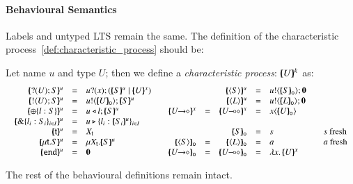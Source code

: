 
\paragraph{Behavioural Semantics}

Labels and untyped LTS remain the same. The definition of the
characteristic process~\ref{def:characteristic_process} should be:
%
\begin{definition}\rm
	Let name $u$ and type $U$; then we define a {\em characteristic process}:
	$[\!\!(U)\!\!]^{k}$ as:
%
	\[
	\begin{array}{cc}
		\begin{array}{rclcl}
			\mapchar{\btinp{U} S}{u} &=& \binp{u}{x} (\mapchar{S}{u} \Par \mapchar{U}{x})
			\\
			\mapchar{\btout{U} S}{u} &=& \bout{u}{\omapchar{U}} \mapchar{S}{u} %
			\\
			\mapchar{\btsel{l : S}}{u} &=& \bsel{u}{l} \mapchar{S}{u}
			\\
			\mapchar{\btbra{l_i: S_i}_{i \in I}}{u} &=& \bbra{u}{l_i: \mapchar{S_i}{u}}_{i \in I}
			\\
			\mapchar{\tvar{t}}{u} &=& \varp{X}_{\vart{t}}
			\\
			\mapchar{\trec{t}{S}}{u} &=& \recp{X_{\vart{t}}}{\mapchar{S}{u}}
			\\
			\mapchar{\tinact}{u} &=& \inact
			\\
		\end{array}
		&
		\begin{array}{rcrclcl}
			&&\mapchar{\chtype{S}}{u} &=& \bout{u}{\omapchar{S}} \inact
			\\
			&&\mapchar{\chtype{L}}{u} &=& \bout{u}{\omapchar{L}} \inact
			\\
			\mapchar{\shot{U}}{x} &=& \mapchar{\lhot{U}}{x} &=& \appl{x}{\omapchar{U}}
			\\
			\\
			&&\omapchar{S} &=& s && s \textrm{ fresh}
			\\
			\omapchar{\chtype{S}} &=& \omapchar{\chtype{L}} &=& a && a \textrm{ fresh}
			\\
			\omapchar{\shot{U}} &=& \omapchar{\lhot{U}} &=& \abs{x}{\mapchar{U}{x}}
		\end{array}
	\end{array}
	\]
\end{definition}

The rest of the behavioural definitions remain intact. 


